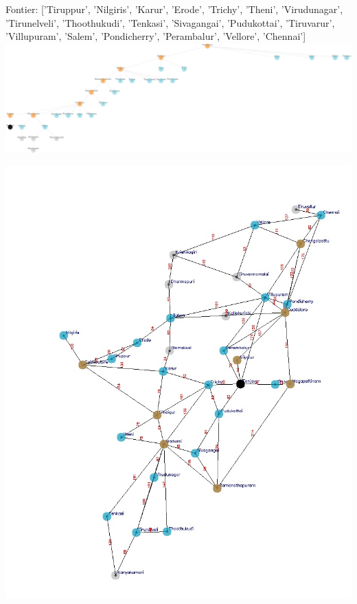 \documentclass[xcolor=table]{beamer}
\begin{document}
\begin{frame}
  { \tiny Fontier: ['Tiruppur', 'Nilgiris', 'Karur', 'Erode', 'Trichy', 'Theni', 'Virudunagar', 'Tirunelveli', 'Thoothukudi', 'Tenkasi', 'Sivagangai', 'Pudukottai', 'Tiruvarur', 'Villupuram', 'Salem', 'Pondicherry', 'Perambalur', 'Vellore', 'Chennai'] }
  \includegraphics[width=1\textwidth]{../DFSNodes/12-1.png}
  \begin{center}
    \includegraphics[height=0.45\textheight]{../DFSoutput/tamilDFS10.jpg}
  \end{center}
\end{frame}
\end{document}
